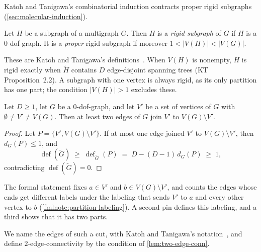 Katoh and Tanigawa's combinatorial induction contracts proper rigid
subgraphs (\cref{sec:molecular-induction}).

\begin{definition}
  \label{def:rigid-subgraph}
  \leanok
  Let $H$ be a subgraph of a multigraph $G$. Then $H$ is a \emph{rigid
  subgraph} of $G$ if $H$ is a $0$-dof-graph. It is a \emph{proper}
  rigid subgraph if moreover $1 < |V(H)| < |V(G)|$.
\end{definition}

These are Katoh and Tanigawa's
definitions~\cite[pp.~658--659]{katohTanigawa2011}. When $V(H)$ is
nonempty, $H$ is rigid exactly when $\tilde H$ contains $D$
edge-disjoint spanning trees (KT Proposition~2.2). A subgraph with one
vertex is always rigid, as its only partition has one part; the
condition $|V(H)| > 1$ excludes these.

\begin{lemma}
  \label{lem:two-edge-conn}
  \leanok
  Let $D \ge 1$, let $G$ be a $0$-dof-graph, and let $V'$ be a set of
  vertices of $G$ with $\emptyset \neq V' \neq V(G)$. Then at least two
  edges of $G$ join $V'$ to $V(G) \setminus V'$.
\end{lemma}
\begin{proof}
  \leanok
  Let $P = \{V', V(G) \setminus V'\}$. If at most one edge joined $V'$
  to $V(G) \setminus V'$, then $d_G(P) \le 1$, and
  \[
    \operatorname{def}(\tilde G) \;\ge\; \operatorname{def}_{\tilde G}(P)
    \;=\; D - (D-1)\,d_G(P) \;\ge\; 1,
  \]
  contradicting $\operatorname{def}(\tilde G) = 0$.
\end{proof}
\begin{fmlnote}
  The formal statement fixes $a \in V'$ and $b \in V(G) \setminus V'$,
  and counts the edges whose ends get different labels under the
  labeling that sends $V'$ to $a$ and every other vertex to $b$
  (\cref{fmlnote:partition-labeling}). A second pin defines this
  labeling, and a third shows that it has two parts.
\end{fmlnote}

We name the edges of such a cut, with Katoh and Tanigawa's
notation~\cite[p.~654]{katohTanigawa2011}, and define
$2$-edge-connectivity by the condition of \cref{lem:two-edge-conn}.

